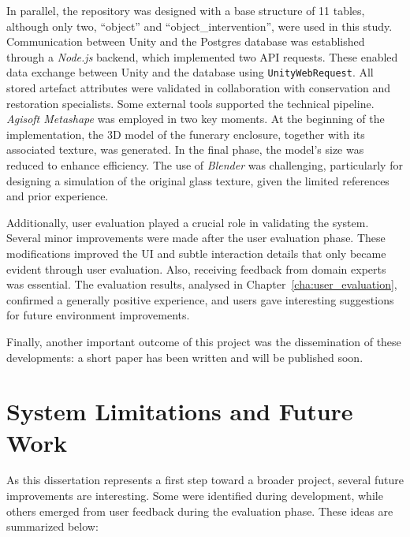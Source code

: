 In parallel, the repository was designed with a base structure of 11 tables, although only two, “object” and “object\_intervention”, were used in this study. Communication between Unity and the Postgres database was established through a \emph{Node.js} backend, which implemented two \gls{API} requests. These enabled data exchange between Unity and the database using \texttt{UnityWebRequest}. All stored artefact attributes were validated in collaboration with conservation and restoration specialists.
Some external tools supported the technical pipeline. \emph{Agisoft Metashape} was employed in two key moments. 
At the beginning of the implementation,  the \gls{3D} model of the funerary enclosure, together with its associated texture, was generated. In the final phase, the model's size was reduced to enhance efficiency.
The use of \emph{Blender} was challenging, particularly for designing a simulation of the original glass texture, given the limited references and prior experience.

Additionally, user evaluation played a crucial role in validating the system. Several minor improvements were made after the user evaluation phase. These modifications improved the \gls{UI} and subtle interaction details that only became evident through user evaluation. Also, receiving feedback from domain experts was essential. The evaluation results, analysed in Chapter~\ref{cha:user_evaluation}, confirmed a generally positive experience, and users gave interesting suggestions for future environment improvements.

Finally, another important outcome of this project was the dissemination of these developments: a short paper has been written and will be published soon.


\section{System Limitations and Future Work}
\label{sec:future}
As this dissertation represents a first step toward a broader project, several future improvements are interesting. 
Some were identified during development, while others emerged from user feedback during the evaluation phase. 
These ideas are summarized below:


